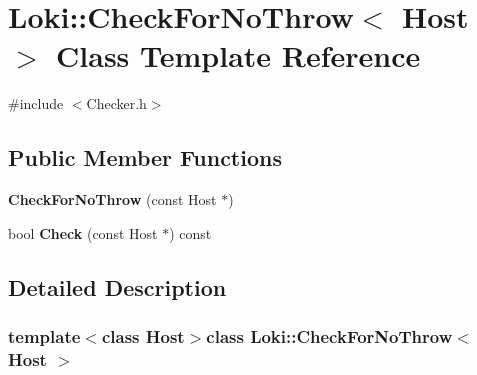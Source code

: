 \hypertarget{classLoki_1_1CheckForNoThrow}{}\section{Loki\+:\+:Check\+For\+No\+Throw$<$ Host $>$ Class Template Reference}
\label{classLoki_1_1CheckForNoThrow}


{\ttfamily \#include $<$Checker.\+h$>$}

\subsection*{Public Member Functions}
\begin{DoxyCompactItemize}
\item 
\hypertarget{classLoki_1_1CheckForNoThrow_a31fcc4282012d677b27502ff7ec6a885}{}{\bfseries Check\+For\+No\+Throw} (const Host $\ast$)\label{classLoki_1_1CheckForNoThrow_a31fcc4282012d677b27502ff7ec6a885}

\item 
\hypertarget{classLoki_1_1CheckForNoThrow_a919b8566f3443d77fb2126dd159bc3cd}{}bool {\bfseries Check} (const Host $\ast$) const \label{classLoki_1_1CheckForNoThrow_a919b8566f3443d77fb2126dd159bc3cd}

\end{DoxyCompactItemize}


\subsection{Detailed Description}
\subsubsection*{template$<$class Host$>$class Loki\+::\+Check\+For\+No\+Throw$<$ Host $>$}

